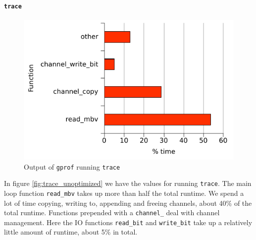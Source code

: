 \paragraph{\texttt{trace}}
\begin{figure}
  \centering
  \includegraphics[]{optimizations/trace_unoptimized.pdf}
  \caption{Output of \texttt{gprof} running \texttt{trace}}
  \label{fig:trace_unoptimized}
\end{figure}
In figure \vref{fig:trace_unoptimized} we have the values for running
\texttt{trace}. The main loop function \lstinline{read_mbv} takes up
more than half the total runtime. We spend a lot of time copying,
writing to, appending and freeing channels, about 40\% of the total
runtime. Functions prepended with a \lstinline{channel_} deal with
channel management. Here the IO functions \lstinline{read_bit} and
\lstinline{write_bit} take up a relatively little amount of runtime,
about 5\% in total.

